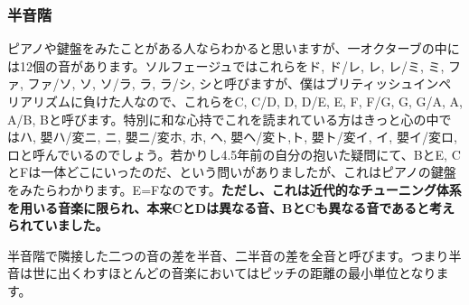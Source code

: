 \documentclass[11pt]{ltjarticle}
\begin{document}
\subsubsection{半音階}
ピアノや鍵盤をみたことがある人ならわかると思いますが、一オクターブの中には12個の音があります。ソルフェージュではこれらをド, ド\sh /レ\fl , レ, レ\sh /ミ\fl , ミ, ファ, ファ\sh /ソ\fl , ソ, ソ\sh /ラ\fl, ラ, ラ\sh /シ\fl , シと呼びますが、僕はブリティッシュインペリアリズムに負けた人なので、これらをC, C\sh /D\fl , D, D\sh /E\fl , E, F, F\sh /G\fl, G, G\sh /A\fl , A, A\sh /B\fl , Bと呼びます。特別に和な心持でこれを読まれている方はきっと心の中ではハ, 嬰ハ/変ニ, ニ, 嬰ニ/変ホ, ホ, ヘ, 嬰ヘ/変ト,ト, 嬰ト/変イ, イ, 嬰イ/変ロ, ロと呼んでいるのでしょう。若かりし4.5年前の自分の抱いた疑問にて、B\sh とE\sh , C\fl とF\fl は一体どこにいったのだ、という問いがありましたが、これはピアノの鍵盤をみたらわかります。E\sh =Fなのです。\textbf{ただし、これは近代的なチューニング体系を用いる音楽に限られ、本来C\sh とD\fl は異なる音、B\sh とCも異なる音であると考えられていました。}\par
半音階で隣接した二つの音の差を半音、二半音の差を全音と呼びます。つまり半音は世に出くわすほとんどの音楽においてはピッチの距離の最小単位となります。
\end{document}
